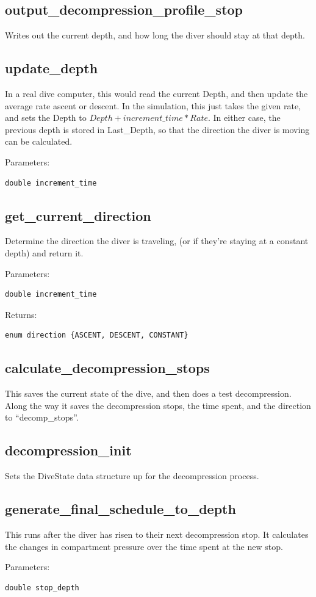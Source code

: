 \documentclass[12pt]{article}
\begin{document}
\subsection{output\_decompression\_profile\_stop}
Writes out the current depth, and how long the diver should stay at that depth.

\subsection{update\_depth}
In a real dive computer, this would read the current Depth, and then update the average
rate ascent or descent. In the simulation, this just takes the given rate, and sets
the Depth to $Depth + increment\_time * Rate$. In either case, the previous depth is
stored in Last\_Depth, so that the direction the diver is moving can be calculated.

Parameters:
\begin{verbatim}
double increment_time
\end{verbatim}

\subsection{get\_current\_direction}
Determine the direction the diver is traveling, (or if they're staying at a constant depth) and return it.

Parameters:
\begin{verbatim}
double increment_time
\end{verbatim}

Returns:
\begin{verbatim}
enum direction {ASCENT, DESCENT, CONSTANT}
\end{verbatim}

\subsection{calculate\_decompression\_stops}

This saves the current state of the dive, and then does a test decompression. Along
the way it saves the decompression stops, the time spent, and the direction to ``decomp\_stops''.

\subsection{decompression\_init}
Sets the DiveState data structure up for the decompression process.

\subsection{generate\_final\_schedule\_to\_depth}
This runs after the diver has risen to their next decompression stop. It calculates
the changes in compartment pressure over the time spent at the new stop.

Parameters:
\begin{verbatim}
double stop_depth
\end{verbatim}

\newpage
\printglossary
{}
\end{document}
